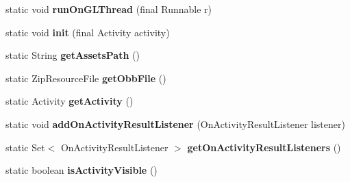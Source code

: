 \begin{DoxyCompactItemize}
\item 
\mbox{\label{classorg_1_1cocos2dx_1_1lib_1_1Cocos2dxHelper_a132bf82f4a49a53c3c7f71eb4fdff10e}} 
static void {\bfseries run\+On\+G\+L\+Thread} (final Runnable r)
\item 
\mbox{\label{classorg_1_1cocos2dx_1_1lib_1_1Cocos2dxHelper_ab7491aa2e4ea85d0a1e29e97cdc8d61a}} 
static void {\bfseries init} (final Activity activity)
\item 
\mbox{\label{classorg_1_1cocos2dx_1_1lib_1_1Cocos2dxHelper_a672fe73fa5ca953bcca2ed6f8093f65f}} 
static String {\bfseries get\+Assets\+Path} ()
\item 
\mbox{\label{classorg_1_1cocos2dx_1_1lib_1_1Cocos2dxHelper_a29e431c86a8643b06b7cd11fab55cb11}} 
static Zip\+Resource\+File {\bfseries get\+Obb\+File} ()
\item 
\mbox{\label{classorg_1_1cocos2dx_1_1lib_1_1Cocos2dxHelper_a8855b74d2ecb5b1c3862147b7a20c471}} 
static Activity {\bfseries get\+Activity} ()
\item 
\mbox{\label{classorg_1_1cocos2dx_1_1lib_1_1Cocos2dxHelper_a1e683f632a75a80028b597ed7d703466}} 
static void {\bfseries add\+On\+Activity\+Result\+Listener} (On\+Activity\+Result\+Listener listener)
\item 
\mbox{\label{classorg_1_1cocos2dx_1_1lib_1_1Cocos2dxHelper_aea55b630ed46e74ea00365ec608a1e60}} 
static Set$<$ On\+Activity\+Result\+Listener $>$ {\bfseries get\+On\+Activity\+Result\+Listeners} ()
\item 
\mbox{\label{classorg_1_1cocos2dx_1_1lib_1_1Cocos2dxHelper_a6f1eb4434a78f31b3fd461bba28068b7}} 
static boolean {\bfseries is\+Activity\+Visible} ()
\item 
\mbox{\label{classorg_1_1cocos2dx_1_1lib_1_1Cocos2dxHelper_af50dfed99649d6946249f1edbdaf2497}} 

\end{DoxyCompactItemize}
